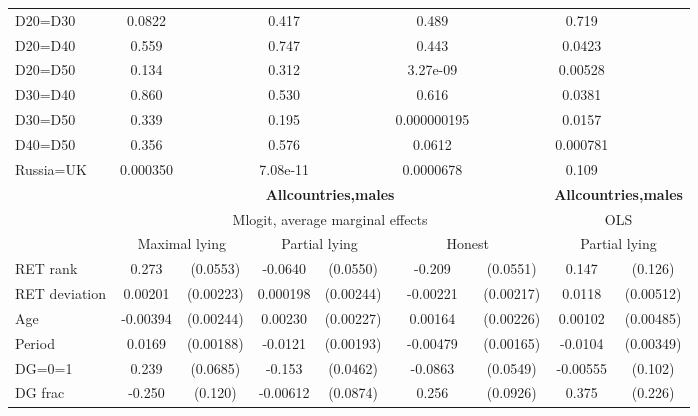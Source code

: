 \begin{tabular}{l|cccccc|cc}
D20=D30         &   0.0822         &         &    0.417         &         &    0.489         &         &    0.719         &         \\
D20=D40         &    0.559         &         &    0.747         &         &    0.443         &         &   0.0423         &         \\
D20=D50         &    0.134         &         &    0.312         &         & 3.27e-09         &         &  0.00528         &         \\
D30=D40         &    0.860         &         &    0.530         &         &    0.616         &         &   0.0381         &         \\
D30=D50         &    0.339         &         &    0.195         &         &0.000000195         &         &   0.0157         &         \\
D40=D50         &    0.356         &         &    0.576         &         &   0.0612         &         & 0.000781         &         \\
Russia=UK       & 0.000350         &         & 7.08e-11         &         &0.0000678         &         &    0.109         &         \\
\hline\hline
&\multicolumn{6}{c|}{\bf All\space{}countries,\space{}males}&\multicolumn{2}{c}{\bf All\space{}countries,\space{}males}\\ &\multicolumn{6}{c|}{Mlogit, average marginal effects }&\multicolumn{2}{c}{OLS}\\
                &\multicolumn{2}{c}{Maximal lying}&\multicolumn{2}{c}{Partial lying}&\multicolumn{2}{c}{Honest}  &\multicolumn{2}{c}{Partial lying}\\
\hline
RET rank        &    0.273\sym{***}& (0.0553)&  -0.0640         & (0.0550)&   -0.209\sym{***}& (0.0551)&    0.147         &  (0.126)\\
RET deviation   &  0.00201         &(0.00223)& 0.000198         &(0.00244)& -0.00221         &(0.00217)&   0.0118\sym{**} &(0.00512)\\
Age             & -0.00394         &(0.00244)&  0.00230         &(0.00227)&  0.00164         &(0.00226)&  0.00102         &(0.00485)\\
Period          &   0.0169\sym{***}&(0.00188)&  -0.0121\sym{***}&(0.00193)& -0.00479\sym{***}&(0.00165)&  -0.0104\sym{***}&(0.00349)\\
DG=0=1          &    0.239\sym{***}& (0.0685)&   -0.153\sym{***}& (0.0462)&  -0.0863         & (0.0549)& -0.00555         &  (0.102)\\
DG frac         &   -0.250\sym{**} &  (0.120)& -0.00612         & (0.0874)&    0.256\sym{***}& (0.0926)&    0.375         &  (0.226)\\

\end{tabular}
